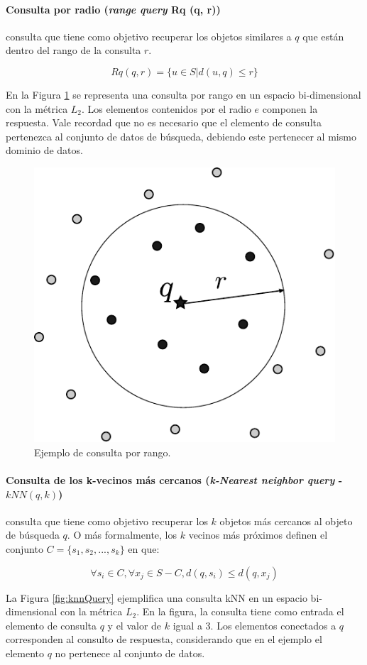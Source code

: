 \paragraph{Consulta por radio (\textit{range query} Rq (q, r))} consulta que tiene como objetivo recuperar los objetos similares a $q$ que están dentro del rango de la consulta $r$.

\begin{equation}
    Rq(q, r) = \{ u \in S | d(u, q) \leq r \}
\end{equation}

En la Figura \ref{fig:rangeQuery} se representa una consulta por rango en un espacio bi-dimensional con la métrica $L_2$. Los elementos contenidos por el radio $e$ componen la respuesta. Vale recordad que no es necesario que el elemento de consulta pertenezca al conjunto de datos de búsqueda, debiendo este pertenecer al mismo dominio de datos.

\begin{figure}[htp]
\centering
\includegraphics[width=0.3\columnwidth]{chapter2/range_query.pdf}
\caption{Ejemplo de consulta por rango.}
\label{fig:rangeQuery}
\end{figure}


\paragraph{Consulta de los k-vecinos más cercanos (\textit{k-Nearest neighbor query} - $kNN (q, k)$)} consulta que tiene como objetivo recuperar los $k$ objetos más cercanos al objeto de búsqueda $q$. O más formalmente, los $k$ vecinos más próximos definen el conjunto  $ C = \{s_1,s_2,...,s_k\} $ en que:

\begin{equation}
    \forall s_i \in C, \forall x_j \in S - C, d(q, s_i) \leq d(q, x_j)
\end{equation}

La Figura \ref{fig:knnQuery} ejemplifica una consulta kNN en un espacio bi-dimensional con la métrica $L_2$. En la figura, la consulta tiene como entrada el elemento de consulta $q$ y el valor de $k$ igual a $3$.  Los elementos conectados a $q$ corresponden al consulto de respuesta, considerando que en el ejemplo el elemento $q$ no pertenece al conjunto de datos.

